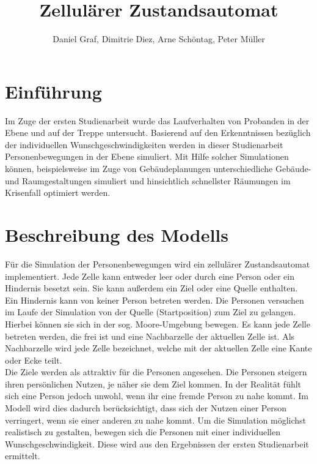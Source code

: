 

\title{Zellulärer Zustandsautomat}
\providecommand{\subtitle}[1]{}
\subtitle{3. Projekt zu Modellierung und Simulation}
\author{Daniel Graf, Dimitrie Diez, Arne Schöntag, Peter Müller}
\date{}



\maketitle

\tableofcontents
\section{Einführung}
Im Zuge der ersten Studienarbeit wurde das Laufverhalten von Probanden in der Ebene und auf der Treppe untersucht. Basierend auf den Erkenntnissen bezüglich der individuellen Wunschgeschwindigkeiten werden in dieser Studienarbeit Personenbewegungen in der Ebene simuliert. Mit Hilfe solcher Simulationen können, beispielsweise im Zuge von Gebäudeplanungen unterschiedliche Gebäude- und Raumgestaltungen simuliert und hinsichtlich schnellster Räumungen im Krisenfall optimiert werden. 

\section{Beschreibung des Modells}
Für die Simulation der Personenbewegungen wird ein zellulärer Zustandsautomat implementiert. Jede Zelle kann entweder leer oder durch eine Person oder ein Hindernis besetzt sein. Sie kann außerdem ein Ziel oder eine Quelle enthalten. Ein Hindernis kann von keiner Person betreten werden. Die Personen versuchen im Laufe der Simulation von der Quelle (Startposition) zum Ziel zu gelangen. Hierbei können sie sich in der sog. Moore-Umgebung bewegen. Es kann jede Zelle betreten werden, die frei ist und eine Nachbarzelle der aktuellen Zelle ist. Als Nachbarzelle wird jede Zelle bezeichnet, welche mit der aktuellen Zelle eine Kante oder Ecke teilt. \\
Die Ziele werden als attraktiv für die Personen angesehen. Die Personen steigern ihren persönlichen Nutzen, je näher sie dem Ziel kommen. In der Realität fühlt sich eine Person jedoch unwohl, wenn ihr eine fremde Person zu nahe kommt. Im Modell wird dies dadurch berücksichtigt, dass sich der Nutzen einer Person verringert, wenn sie einer anderen zu nahe kommt. Um die Simulation möglichst realistisch zu gestalten, bewegen sich die Personen mit einer individuellen Wunschgeschwindigkeit. Diese wird aus den Ergebnissen der ersten Studienarbeit ermittelt. \\

